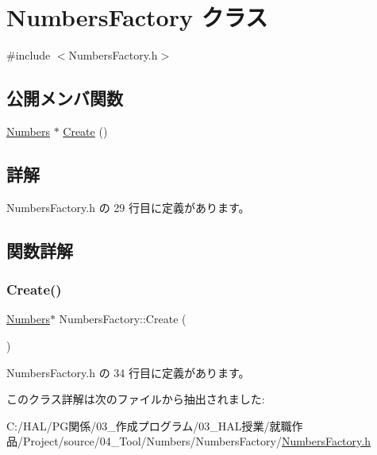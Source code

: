 \hypertarget{class_numbers_factory}{}\section{Numbers\+Factory クラス}
\label{class_numbers_factory}


{\ttfamily \#include $<$Numbers\+Factory.\+h$>$}

\subsection*{公開メンバ関数}
\begin{DoxyCompactItemize}
\item 
\mbox{\hyperlink{class_numbers}{Numbers}} $\ast$ \mbox{\hyperlink{class_numbers_factory_a2d2d0ae4f2d27c25cc73989b64d78c77}{Create}} ()
\end{DoxyCompactItemize}


\subsection{詳解}


 Numbers\+Factory.\+h の 29 行目に定義があります。



\subsection{関数詳解}
\mbox{\label{class_numbers_factory_a2d2d0ae4f2d27c25cc73989b64d78c77}} 
\subsubsection{\texorpdfstring{Create()}{Create()}}
{\footnotesize\ttfamily \mbox{\hyperlink{class_numbers}{Numbers}}$\ast$ Numbers\+Factory\+::\+Create (\begin{DoxyParamCaption}{ }\end{DoxyParamCaption})\hspace{0.3cm}{\ttfamily [inline]}}



 Numbers\+Factory.\+h の 34 行目に定義があります。



このクラス詳解は次のファイルから抽出されました\+:\begin{DoxyCompactItemize}
\item 
C\+:/\+H\+A\+L/\+P\+G関係/03\+\_\+作成プログラム/03\+\_\+\+H\+A\+L授業/就職作品/\+Project/source/04\+\_\+\+Tool/\+Numbers/\+Numbers\+Factory/\mbox{\hyperlink{_numbers_factory_8h}{Numbers\+Factory.\+h}}\end{DoxyCompactItemize}
